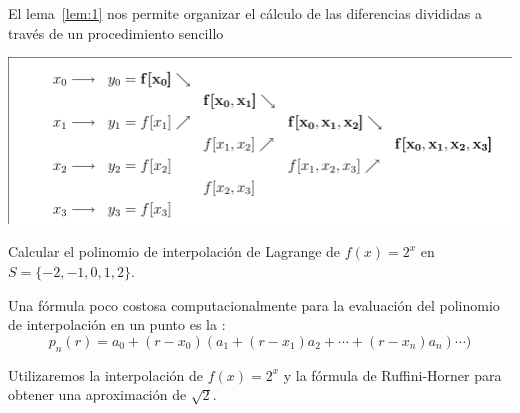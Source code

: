 El lema~\ref{lem:1} nos permite organizar el cálculo de las
diferencias divididas a través de un procedimiento sencillo
\begin{center}
  \includegraphics[width=0.9\linewidth]{tema2/diferencias-div}
\end{center}

\begin{example}
  Calcular el polinomio de interpolación de Lagrange de $f(x)=2^x$ en
  $S=\{-2,-1,0,1,2\}$. 
\end{example}

Una fórmula poco costosa computacionalmente para la evaluación del
polinomio de interpolación en un punto es la : 
\begin{equation*}
  p_n(r) = a_0 + (r-x_0)(a_1 + (r-x_1)a_2 + \cdots + (r-x_n)a_n)\cdots)
\end{equation*}
\begin{example}
  Utilizaremos la interpolación de $f(x)=2^x$ y la fórmula de
  Ruffini-Horner para obtener una aproximación de $\sqrt{2}$.
\end{example}
